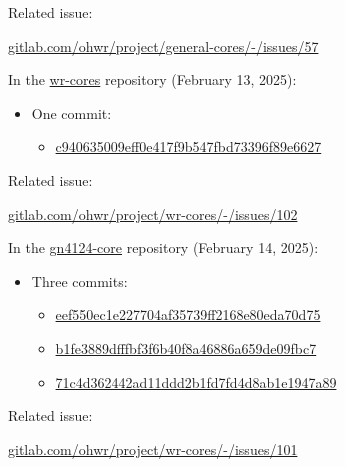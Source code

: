 \noindent Related issue:

\vspace{5mm}

\href{https://gitlab.com/ohwr/project/general-cores/-/issues/57}{gitlab.com/ohwr/project/general-cores/-/issues/57}

\vspace{5mm}

\noindent In the \href{https://gitlab.com/ohwr/project/wr-cores/}{wr-cores} repository (February 13, 2025):

\begin{itemize}
\item One commit:
    \begin{itemize}
    \item \href{https://gitlab.com/ohwr/project/wr-cores/-/commit/c940635009eff0e417f9b547fbd73396f89e6627}{c940635009eff0e417f9b547fbd73396f89e6627}
    \end{itemize}
\end{itemize}

\noindent Related issue:

\vspace{5mm}

\href{https://gitlab.com/ohwr/project/wr-cores/-/issues/102}{gitlab.com/ohwr/project/wr-cores/-/issues/102}

\vspace{5mm}

\noindent In the \href{https://gitlab.com/ohwr/project/gn4124-core/}{gn4124-core} repository (February 14, 2025):

\begin{itemize}
\item Three commits:
    \begin{itemize}
    \item \href{https://gitlab.com/ohwr/project/gn4124-core/-/commit/eef550ec1e227704af35739ff2168e80eda70d75}{eef550ec1e227704af35739ff2168e80eda70d75}
    \item \href{https://gitlab.com/ohwr/project/gn4124-core/-/commit/b1fe3889dfffbf3f6b40f8a46886a659de09fbc7}{b1fe3889dfffbf3f6b40f8a46886a659de09fbc7}
    \item \href{https://gitlab.com/ohwr/project/gn4124-core/-/commit/71c4d362442ad11ddd2b1fd7fd4d8ab1e1947a89}{71c4d362442ad11ddd2b1fd7fd4d8ab1e1947a89}
    \end{itemize}
\end{itemize}

\noindent Related issue:

\vspace{5mm}

\href{https://gitlab.com/ohwr/project/wr-cores/-/issues/101}{gitlab.com/ohwr/project/wr-cores/-/issues/101}
